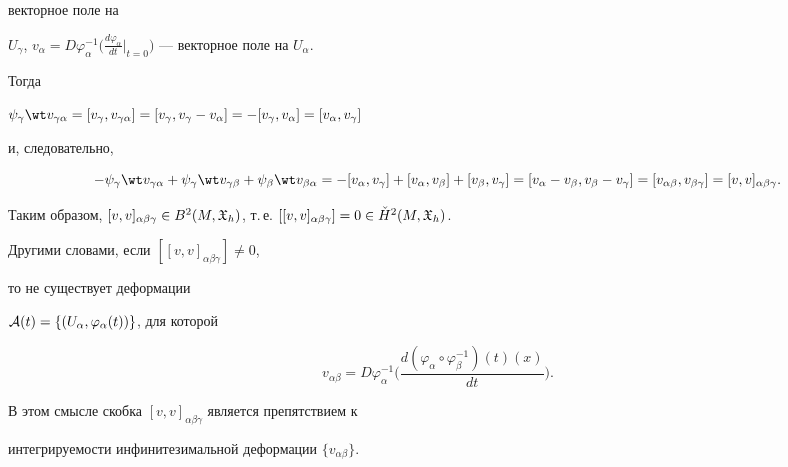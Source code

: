 \begin{pf}
векторное поле на


$U_{\gamma}$, $ v_{\alpha}


= D \varphi_{\alpha}^{-1} \big(\frac{d \varphi


_{\alpha}}{dt} \big|_{t=0}\big)$ --- векторное поле на $U_{\alpha}$.


Тогда


$\psi_{\gamma} \wt v_{\gamma \alpha}=[v_{\gamma},


v_{\gamma \alpha}]=[v_{\gamma}, v_{\gamma} - v_{


\alpha}]=- [v_{\gamma}, v_{\alpha}]=[v_{\alpha},


v_{\gamma}] $


и, следовательно,


$$


- \psi_{\gamma} \wt v_{\gamma \alpha} +


\psi_{\gamma} \wt v_{\gamma \beta} +


\psi_{\beta} \wt v_{\beta \alpha} =


- [v_{\alpha}, v_{\gamma}] + [v_{\alpha}, v_{\beta}] +


[v_{\beta}, v_{\gamma}] =


[v_{\alpha} - v_{\beta},


v_{\beta} - v_{\gamma}]=[v_{\alpha \beta}, v_{\beta


\gamma}] =[v,v]_{\alpha \beta \gamma}.


$$


Таким образом, $[v,v]_{\alpha \beta \gamma} \in B^2(M,


{\frak X}_{h})$, т.\,е. $[[v, v]_{\alpha \beta \gamma}]=0


\in \Check H^2 ({M}, {\frak X}_{h})$. 


Другими словами, если $[[v,v]_{\alpha \beta \gamma}] \ne 0$,


то не существует деформации


${\cal A}(t)=\{(U_{\alpha}, \varphi_{\alpha}(t))\}$, для которой


$$


v_{\alpha \beta}=D\varphi_{\alpha}^{-1}\bigg(


\frac{d(\varphi_{\alpha} \circ \varphi_{\beta}^{-1})(t)(x)}{dt}\bigg).


$$


В этом смысле скобка $[v,v]_{\alpha \beta \gamma}$ является препятствием к


интегрируемости инфинитезимальной деформации $\{v_{\alpha\beta}\}$.






\end{pf}

